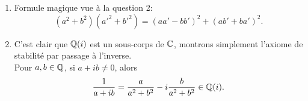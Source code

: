{\begin{td-sol}[]
\begin{enumerate}
            \ptr{} Montrons maintenant le sens réciproque.\\
            On suppose que \(N(z) = 1\).\\
            Alors \(z = a+ib\) avec \(a,b\in\bb Z\) et \(a^2+b^2 = 1\).
            Alors
            \begin{equation*}
                (a+ib)(a-ib) = 1.
            \end{equation*}
            Donc \(a+ib\) est inversible dans \(\bb Z[i]\),
            d'inverse \(a-ib\).

            Pour \(a,b\in\bb Z\), on a
            \begin{equation*}
                a^2+b^2 = 1 \iff (a,b) \in \left\{(1,0),(0,1),(-1,0),(0,-1)\right\}.
            \end{equation*}
            Donc les inversibles de \(\bb Z[i]\) sont
            \begin{equation*}
                \bb {Z[i]}^\times = \{1,-1,i,-i\} = \bb U_4.
            \end{equation*}
            (groupe cyclique d'ordre 4, engendré par \(i\) ou \(-i\))

            \item Formule magique vue à la question 2:
            \begin{equation*}
                (a^2+b^2)(a'^2+b'^2) = {(aa'-bb')}^2 + {(ab'+ba')}^2.
            \end{equation*}

            \item C'est clair que \(\mathbb{Q}(i)\) est un sous-corps de \(\mathbb{C}\),
            montrons simplement l'axiome de stabilité par passage à l'inverse.\\
            Pour \(a,b\in\mathbb{Q}\), si \(a+ib\neq 0\), alors
            \begin{equation*}
                \frac{1}{a+ib} = \frac{a}{a^2+b^2} - i\frac{b}{a^2+b^2} \in \mathbb{Q}(i).
            \end{equation*}
        \end{enumerate}
    \end{td-sol}
}{}

